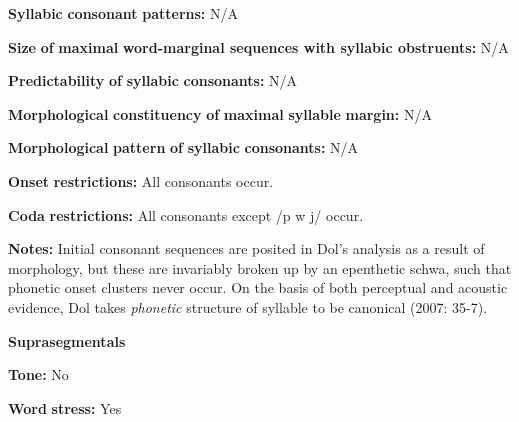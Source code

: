 \documentclass[output=paper]{langsci/langscibook}
\begin{document}
\begin{styleBody}
\textbf{Syllabic} \textbf{consonant} \textbf{patterns:} N/A
\end{styleBody}

\begin{styleBody}
\textbf{Size} \textbf{of} \textbf{maximal} \textbf{word{}-marginal sequences with syllabic obstruents:} N/A
\end{styleBody}

\begin{styleBody}
\textbf{Predictability} \textbf{of} \textbf{syllabic} \textbf{consonants:} N/A
\end{styleBody}

\begin{styleBody}
\textbf{Morphological} \textbf{constituency} \textbf{of} \textbf{maximal} \textbf{syllable} \textbf{margin:} N/A
\end{styleBody}

\begin{styleBody}
\textbf{Morphological} \textbf{pattern} \textbf{of} \textbf{syllabic} \textbf{consonants:} N/A
\end{styleBody}

\begin{styleBody}
\textbf{Onset} \textbf{restrictions:} All consonants occur.
\end{styleBody}

\begin{styleBody}
\textbf{Coda} \textbf{restrictions:} All consonants except /p w j/ occur.
\end{styleBody}

\begin{styleBody}
\textbf{Notes:} Initial consonant sequences are posited in Dol’s analysis as a result of morphology, but these are invariably broken up by an epenthetic schwa, such that phonetic onset clusters never occur. On the basis of both perceptual and acoustic evidence, Dol takes \textit{phonetic} structure of syllable to be canonical (2007: 35-7).
\end{styleBody}

\begin{styleBody}
\textbf{Suprasegmentals}
\end{styleBody}

\begin{styleBody}
\textbf{Tone:} No
\end{styleBody}

\begin{styleBody}
\textbf{Word} \textbf{stress:} Yes
\end{styleBody}
\end{document}

